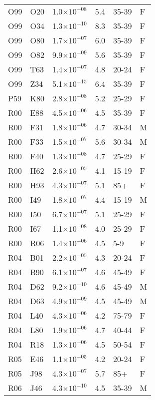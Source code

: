 \begin{longtable}{lllrll}
   O99 & O20 & 1.0$\times10^{-08}$ & 5.4 & 35-39 & F \\ 
   O99 & O34 & 1.3$\times10^{-10}$ & 8.3 & 35-39 & F \\ 
   O99 & O80 & 1.7$\times10^{-07}$ & 6.0 & 35-39 & F \\ 
   O99 & O82 & 9.9$\times10^{-09}$ & 5.6 & 35-39 & F \\ 
   O99 & T63 & 1.4$\times10^{-07}$ & 4.8 & 20-24 & F \\ 
   O99 & Z34 & 5.1$\times10^{-15}$ & 6.4 & 35-39 & F \\ 
   P59 & K80 & 2.8$\times10^{-08}$ & 5.2 & 25-29 & F \\ 
   R00 & E88 & 4.5$\times10^{-06}$ & 4.5 & 35-39 & F \\ 
   R00 & F31 & 1.8$\times10^{-06}$ & 4.7 & 30-34 & M \\ 
   R00 & F33 & 1.5$\times10^{-07}$ & 5.6 & 30-34 & M \\ 
   R00 & F40 & 1.3$\times10^{-08}$ & 4.7 & 25-29 & F \\ 
   R00 & H62 & 2.6$\times10^{-05}$ & 4.1 & 15-19 & F \\ 
   R00 & H93 & 4.3$\times10^{-07}$ & 5.1 & 85+ & F \\ 
   R00 & I49 & 1.8$\times10^{-07}$ & 4.4 & 15-19 & M \\ 
   R00 & I50 & 6.7$\times10^{-07}$ & 5.1 & 25-29 & F \\ 
   R00 & I67 & 1.1$\times10^{-08}$ & 4.0 & 25-29 & F \\ 
   R00 & R06 & 1.4$\times10^{-06}$ & 4.5 & 5-9 & F \\ 
   R04 & B01 & 2.2$\times10^{-05}$ & 4.3 & 20-24 & F \\ 
   R04 & B90 & 6.1$\times10^{-07}$ & 4.6 & 45-49 & F \\ 
   R04 & D62 & 9.2$\times10^{-10}$ & 4.6 & 45-49 & M \\ 
   R04 & D63 & 4.9$\times10^{-09}$ & 4.5 & 45-49 & M \\ 
   R04 & L40 & 4.3$\times10^{-06}$ & 4.2 & 75-79 & F \\ 
   R04 & L80 & 1.9$\times10^{-06}$ & 4.7 & 40-44 & F \\ 
   R04 & R18 & 1.3$\times10^{-06}$ & 4.5 & 50-54 & F \\ 
   R05 & E46 & 1.1$\times10^{-05}$ & 4.2 & 20-24 & F \\ 
   R05 & J98 & 4.3$\times10^{-07}$ & 5.7 & 85+ & F \\ 
   R06 & J46 & 4.3$\times10^{-10}$ & 4.5 & 35-39 & M \\ 

\end{longtable}
